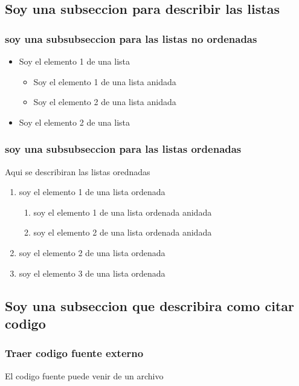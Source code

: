 \documentclass[journal]{IEEEtran}
\begin{document}
\subsection{Soy una subseccion para describir las listas}
\subsubsection{soy una subsubseccion para las listas no ordenadas}
\begin{itemize}
    \item Soy el elemento 1 de una lista
    \begin{itemize}
        \item Soy el elemento 1 de una lista anidada
        \item Soy el elemento 2 de una lista anidada
    \end{itemize}
    \item Soy el elemento 2 de una lista
\end{itemize}

\subsubsection{soy una subsubseccion para las listas ordenadas}
Aqui se describiran las listas orednadas
\begin{enumerate}
    \item soy el elemento 1 de una lista ordenada
    \begin{enumerate}
        \item soy el elemento 1 de una lista ordenada anidada
        \item soy el elemento 2 de una lista ordenada anidada
    \end{enumerate}
    \item soy el elemento 2 de una lista ordenada
    \item soy el elemento 3 de una lista ordenada
\end{enumerate}
\subsection{Soy una subseccion que describira como citar codigo}
\subsubsection{Traer codigo fuente externo}
El codigo fuente puede venir de un archivo

\end{document}

